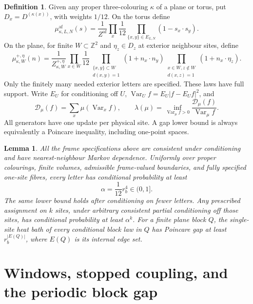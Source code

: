 \documentclass[11pt,reqno]{amsart}
\newtheorem{lemma}[theorem]{Lemma}
\theoremstyle{definition}
\newtheorem{definition}[theorem]{Definition}
\theoremstyle{remark}
\begin{document}
\begin{definition}\label{d:framemodel}
Given any proper three-colouring \(\kappa\) of a plane or torus,
put \(D_x=D^{(\kappa(x))}\), with weights \(1/12\).
On the torus define
\[
 \mu^{\mathrm{af}}_{\kappa,L,N}(s)=
 \frac1{Z^{\mathrm{af}}}\prod_x\frac1{12}
       \prod_{\{x,y\}\in E_{L,N}}(1-s_x\cdot s_y).
\]
On the plane, for finite \(W\subset\mathbb Z^2\) and
\(\eta_z\in D_z\) at exterior neighbour sites, define
\[
 \mu^{+,\eta}_{\kappa,W}(n)=\frac1{Z^{+,\eta}_{\kappa,W}}
 \prod_{x\in W}\frac1{12}
 \prod_{\substack{\{x,y\}\subset W\\d(x,y)=1}}(1+n_x\cdot n_y)
 \prod_{\substack{x\in W,z\notin W\\d(x,z)=1}}(1+n_x\cdot\eta_z).
\]
Only the finitely many needed exterior letters are specified.
These laws have full support. Write \(E_U\) for conditioning off \(U\),
\(\operatorname{Var}_U f=E_U|f-E_Uf|^2\), and
\[
 \mathcal D_\mu(f)=\sum_x\mu(\operatorname{Var}_x f),\qquad
 \lambda(\mu)=\inf_{\operatorname{Var}_\mu f>0}
             \frac{\mathcal D_\mu(f)}{\operatorname{Var}_\mu f}.
\]
All generators have one update per physical site. A gap lower bound is
always equivalently a Poincare inequality, including one-point spaces.
\end{definition}

\begin{lemma}\label{l:planeenergy}
All the frame specifications above are consistent under conditioning
and have nearest-neighbour Markov dependence. Uniformly over proper
colourings, finite volumes, admissible frame-valued boundaries, and
fully specified one-site fibres, every letter has conditional
probability at least
\[
 \alpha=\frac1{12}r_b^4\in(0,1].
\]
The same lower bound holds after conditioning on fewer letters.
Any prescribed assignment on \(k\) sites, under arbitrary consistent
partial conditioning off those sites, has conditional probability
at least \(\alpha^k\).
For a finite plane block \(Q\), the single-site heat bath of every conditional block law in \(Q\) has Poincare gap at least
\(r_b^{|E(Q)|}\), where \(E(Q)\) is its internal edge set.
\end{lemma}


\section{Windows, stopped coupling, and the periodic block gap}
\end{document}
